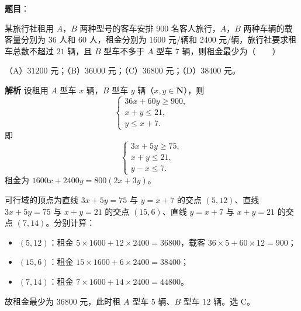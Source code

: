 \begin{answer}

\textbf{题目}：

某旅行社租用 $A$，$B$ 两种型号的客车安排 $900$ 名客人旅行，$A$，$B$ 两种车辆的载客量分别为 $36$ 人和 $60$ 人，租金分别为 $1600$ 元/辆和 $2400$ 元/辆，旅行社要求租车总数不超过 $21$ 辆，且 $B$ 型车不多于 $A$ 型车 $7$ 辆，则租金最少为\mbox{（　　）}

（A）$31200$ 元；（B）$36000$ 元；（C）$36800$ 元；（D）$38400$ 元。

\textbf{解析}
设租用 $A$ 型车 $x$ 辆，$B$ 型车 $y$ 辆（$x,y\in\mathbf N$），则
\nopagebreak[4]
\[\begin{cases}
36x+60y\geqslant900,\\
x+y\leqslant21,\\
y\leqslant x+7.
\end{cases}\]
即
\nopagebreak[4]
\[\begin{cases}
3x+5y\geqslant75,\\
x+y\leqslant21,\\
y-x\leqslant7.
\end{cases}\]
租金为 $1600x+2400y=800(2x+3y)$。

可行域的顶点为直线 $3x+5y=75$ 与 $y=x+7$ 的交点 $(5,12)$、直线 $3x+5y=75$ 与 $x+y=21$ 的交点 $(15,6)$、直线 $y=x+7$ 与 $x+y=21$ 的交点 $(7,14)$。分别计算：

\begin{itemize}
\item $(5,12)$：租金 $5\times1600+12\times2400=36800$，载客 $36\times5+60\times12=900$；
\item $(15,6)$：租金 $15\times1600+6\times2400=38400$；
\item $(7,14)$：租金 $7\times1600+14\times2400=44800$。
\end{itemize}

故租金最少为 $36800$ 元，此时租 $A$ 型车 $5$ 辆、$B$ 型车 $12$ 辆。选 C。


\end{answer}
